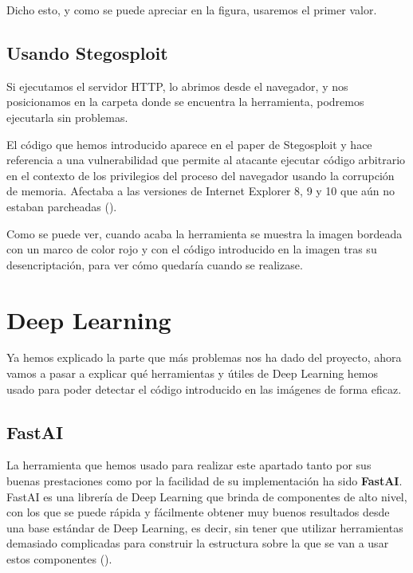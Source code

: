 Dicho esto, y como se puede apreciar en la figura, usaremos el primer valor.

\subsection{Usando Stegosploit}

Si ejecutamos el servidor HTTP, lo abrimos desde el navegador, y nos posicionamos en la carpeta donde se encuentra la herramienta, podremos ejecutarla sin problemas.



El código que hemos introducido aparece en el paper de Stegosploit y hace referencia a una vulnerabilidad que permite al atacante ejecutar código arbitrario en el contexto de los privilegios del proceso del navegador usando la corrupción de memoria. Afectaba a las versiones de Internet Explorer 8, 9 y 10 que aún no estaban parcheadas (\cite{CVE-2014-0282}). %


Como se puede ver, cuando acaba la herramienta se muestra la imagen bordeada con un marco de color rojo y con el código introducido en la imagen tras su desencriptación, para ver cómo quedaría cuando se realizase.

\section{Deep Learning}
\label{sec:fastai}

Ya hemos explicado la parte que más problemas nos ha dado del proyecto, ahora vamos a pasar a explicar qué herramientas y útiles de Deep Learning hemos usado para poder detectar el código introducido en las imágenes de forma eficaz.

\subsection{FastAI}

La herramienta que hemos usado para realizar este apartado tanto por sus buenas prestaciones como por la facilidad de su implementación ha sido \textbf{FastAI}. FastAI es una librería de Deep Learning que brinda de componentes de alto nivel, con los que se puede rápida y fácilmente obtener muy buenos resultados desde una base estándar de Deep Learning, es decir, sin tener que utilizar herramientas demasiado complicadas para construir la estructura sobre la que se van a usar estos componentes (\cite{fastai}). %

